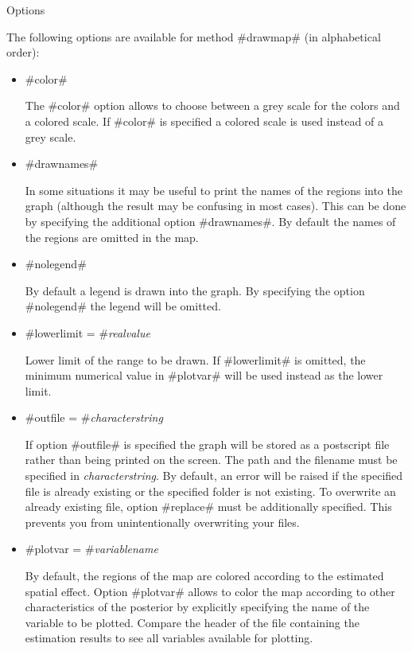 \begin{stanza}{Options}

The following options are available for method #drawmap# (in
alphabetical order):

\end{stanza}

\begin{itemize}
\item #color#

The #color# option allows to choose between a grey scale for the
colors and a colored scale. If #color# is specified a colored
scale is used instead of a grey scale.

\item #drawnames#

In some situations it may be useful to print the names of the
regions into the graph (although the result may be confusing in
most cases). This can be done by specifying the additional option
#drawnames#. By default the names of the regions are omitted in
the map.

\item #nolegend#

By default a legend is drawn into the graph. By specifying the
option #nolegend# the legend will be omitted.

\item #lowerlimit = #{\em realvalue}

Lower limit of the range to be drawn. If #lowerlimit# is omitted,
the minimum numerical value in #plotvar# will be used instead as
the lower limit.

\item #outfile = #{\em characterstring}

If option #outfile# is specified the graph will be stored as a
postscript file rather than being printed on the screen. The path
and the filename must be specified in {\em characterstring}. By
default, an error will be raised if the specified file is already
existing or the specified folder is not existing. To overwrite an
already existing file, option #replace# must be additionally
specified. This prevents you from unintentionally overwriting your
files.

\item #plotvar = #{\em variablename}

By default, the regions of the map are colored according to the
estimated spatial effect. Option #plotvar# allows to color the map
according to other characteristics of the posterior by explicitly
specifying the name of the variable to be plotted. Compare the
header of the file containing the estimation results to see all
variables available for plotting.


\end{itemize}
